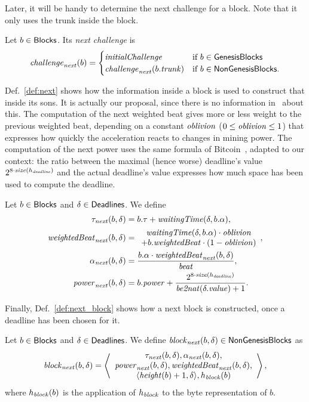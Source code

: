 Later, it will be handy to determine the next challenge for a block. Note that
it only uses the trunk inside the block.
%
\begin{definition}\label{def:next_challenge_from_block}
  Let $b\in{\mathsf{Blocks}}$. Its \emph{next challenge} is
  \[
  {\mathit{challenge}}_{\mathit{next}}(b)=\begin{cases}
  {\mathit{initialChallenge}} & \text{if $b\in{\mathsf{GenesisBlocks}}$}\\
  {\mathit{challenge}}_{\mathit{next}}(b.{\mathit{trunk}}) & \text{if $b\in{\mathsf{NonGenesisBlocks}}$.}
  \end{cases}
  \]
\end{definition}

Def.~\ref{def:next} shows how the information inside a block is used to construct
that inside its sons. It is actually our proposal, since there is no information
in~\cite{SignumPlotting} about this. The computation of the next weighted beat
gives more or less weight to the previous weighted beat, depending on a constant ${\mathit{oblivion}}$
($0\le{\mathit{oblivion}}\le 1$) that expresses how quickly the acceleration reacts to changes
in mining power. The computation of the next power uses the same formula
of Bitcoin~\cite{WalkerG24}, adapted to our context: the ratio between the maximal (hence worse)
deadline's value $2^{8\cdot{\mathit{size}}(h_{\mathit{deadline}})}$ and the actual deadline's value
expresses how much space has been used to compute the deadline.
%
\begin{definition}\label{def:next}
  Let $b\in{\mathsf{Blocks}}$ and $\delta\in{\mathsf{Deadlines}}$. We define
  \begin{align*}
    \tau_{\mathit{next}}(b,\delta)&=b.\tau+{\mathit{waitingTime}}(\delta,b.\alpha),\\
    \mathit{weightedBeat}_{\mathit{next}}(b,\delta)&=\begin{array}{c}
    {\mathit{waitingTime}}(\delta,b.\alpha)\cdot{\mathit{oblivion}}\\
    +b.\mathit{weightedBeat}\cdot(1-{\mathit{oblivion}})
    \end{array},\\
    \alpha_{\mathit{next}}(b,\delta)&=\frac{b.\alpha\cdot\mathit{weightedBeat}_{\mathit{next}}(b,\delta)}{{\mathit{beat}}},\\
    {\mathit{power}}_{\mathit{next}}(b,\delta)&=b.{\mathit{power}}+\frac{2^{8\cdot{\mathit{size}}(h_{\mathit{deadline}})}}{{\mathit{be2nat}}(\delta.\mathit{value})+1}.
  \end{align*}
\end{definition}
%
Finally, Def.~\ref{def:next_block} shows how a next block is constructed, once
a deadline has been chosen for it.
%
\begin{definition}\label{def:next_block}
  Let $b\in{\mathsf{Blocks}}$ and $\delta\in{\mathsf{Deadlines}}$. We define
  ${\mathit{block}}_{\mathit{next}}(b,\delta)\in{\mathsf{NonGenesisBlocks}}$ as
  \[
  {\mathit{block}}_{\mathit{next}}(b,\delta)=\left\langle\begin{array}{c}
  \tau_{\mathit{next}}(b,\delta),\alpha_{\mathit{next}}(b,\delta),\\
  {\mathit{power}}_{\mathit{next}}(b,\delta),\mathit{weightedBeat}_{\mathit{next}}(b,\delta),\\
  \langle{\mathit{height}}(b)+1,\delta\rangle,h_{\mathit{block}}(b)
  \end{array}\right\rangle,
  \]
  where $h_{\mathit{block}}(b)$ is the application of $h_{\mathit{block}}$ to the byte representation of $b$.
\end{definition}

